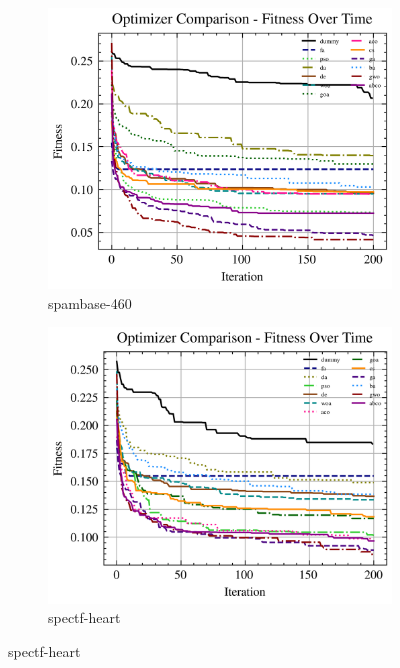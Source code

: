 \begin{figure}[htp]
    \centering
    \begin{subfigure}[htp]{0.45\textwidth}
        \includegraphics[width=\textwidth]{imagenes/fitness_charts/img/binary/spambase-460/optimizers_fitness_knn.png}
        \caption{spambase-460}
        \label{fig:convergencia_spambase-460_knn}
    \end{subfigure}
    \begin{subfigure}[htp]{0.45\textwidth}
        \includegraphics[width=\textwidth]{imagenes/fitness_charts/img/binary/spectf-heart/optimizers_fitness_knn.png}
        \caption{spectf-heart}
        \label{fig:convergencia_spectf-heart_knn}
    \end{subfigure}


\end{figure}
